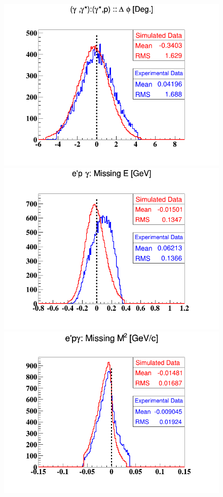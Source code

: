 \begin{figure}[h!]
\includegraphics[scale=0.35]{fig_dvcs/comp/InCoh_delta_phi_InCoh.png}
\includegraphics[scale=0.35]{fig_dvcs/comp/InCoh_epgamma_E_Mis.png}
\includegraphics[scale=0.35]{fig_dvcs/comp/InCoh_epgamma_M2_Mis.png}

\end{figure}

